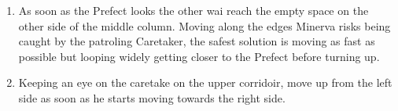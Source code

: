 \begin{enumerate}[label={\arabic*.}]
	\item As soon as the Prefect looks the other wai reach the empty space on the other side of the middle column. Moving along the edges Minerva risks being caught by the patroling Caretaker, the safest solution is moving as fast as possible but looping widely getting closer to the Prefect before turning up.
	\item Keeping an eye on the caretake on the upper corridoir, move up from the left side as soon as he starts moving towards the right side.
\end{enumerate}

\pagebreak